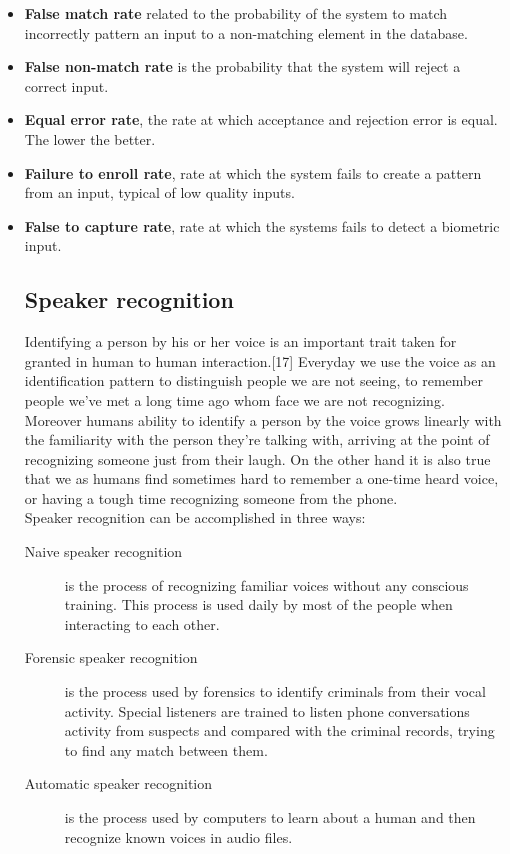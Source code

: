\begin{itemize}
    \item \textbf{False match rate} related to the probability of the system to
    match incorrectly pattern an input to a non-matching element in the database.
    \item \textbf{False non-match rate} is the probability that the system will reject
    a correct input.
    \item \textbf{Equal error rate}, the rate at which acceptance and rejection error is
    equal. The lower the better.
    \item \textbf{Failure to enroll rate}, rate at which the system fails to create
    a pattern from an input, typical of low quality inputs.
    \item \textbf{False to capture rate}, rate at which the systems fails to detect
    a biometric input.

\subsection{Speaker recognition}
Identifying a person by his or her voice is an important trait taken for granted
in human to human interaction.[17] Everyday we use the voice as an identification pattern
to distinguish people we are not seeing, to remember people
we've met a long time ago whom face we are not recognizing.
Moreover humans ability to identify a person by the voice grows linearly
with the familiarity with the person they're talking with, arriving at the point
of recognizing someone just from their laugh. On the other hand it is
also true that we as humans find sometimes hard to remember a one-time heard voice,
or having a tough time recognizing someone from the phone.\\
Speaker recognition can be accomplished in three ways:
\begin{description}
    \item[Naive speaker recognition] is the process of recognizing familiar
    voices without any conscious training. This process is used daily by most of the people
    when interacting to each other.
    \item[Forensic speaker recognition] is the process used by forensics to identify
    criminals from their vocal activity. Special listeners are trained to listen phone
    conversations activity from suspects and compared with the criminal records, trying
    to find any match between them.
    \item[Automatic speaker recognition] is the process used by computers to learn
    about a human and then recognize known voices in audio files.
\end{description}


\end{itemize}
